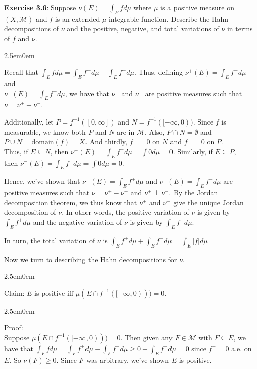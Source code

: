 \documentclass{book}
\newcommand{\exTwoP}{%
   \color{RedViolet}%
   \fontsize{13}{15}\selectfont%
}
\newcommand{\exPPP}{%
   \color{VioletRed}%
   \fontsize{12}{14}\selectfont%
}
\newenvironment{myIndent}{%
   \begin{adjustwidth}{2.5em}{0em}%
}{%
   \end{adjustwidth}%
}
\newcommand{\blab}[1]{\textbf{#1}}
\newcommand{\retTwo}{\hfill\bigbreak}
\begin{document}
\blab{Exercise 3.6}: Suppose $\nu(E) = \int_E f d\mu$ where $\mu$ is a positive measure on $(X, \mathcal{M})$ and $f$ is an extended $\mu$-integrable function. Describe the Hahn decompositions of $\nu$ and the positive, negative, and total variations of $\nu$ in terms of $f$ and $\nu$.

\begin{myIndent}\exTwoP
	Recall that $\int_E f d\mu = \int_E f^+ d\mu - \int_E f^-d\mu$. Thus, defining $\nu^+(E) = \int_E f^+ d\mu$ and\\ [2pt] $\nu^-(E) = \int_E f^-d\mu$, we have that $\nu^+$ and $\nu^-$ are positive measures such that\\ $\nu = \nu^+ - \nu^-$.\retTwo
	
	Additionally, let $P = f^{-1}( [0, \infty])$ and $N = f^{-1}( [-\infty, 0))$. Since $f$ is\\ measurable, we know both $P$ and $N$ are in $\mathcal{M}$. Also, $P \cap N = \emptyset$ and\\ $P \cup N = \mathrm{domain}(f) = X$. And thirdly, $f^+ = 0$ on $N$ and $f^- = 0$ on $P$.\\ Thus, if $E \subseteq N$, then $\nu^+(E) = \int_E f^+d\mu = \int 0 d\mu = 0$.  Similarly, if $E \subseteq P$,\\ then $\nu^-(E) = \int_E f^-d\mu = \int 0 d\mu = 0$.\retTwo

	Hence, we've shown that $\nu^+(E) = \int_E f^+ d\mu$ and $\nu^-(E) = \int_E f^-d\mu$ are positive measures such that $\nu = \nu^+ - \nu^-$ and $\nu^+ \perp \nu^-$. By the Jordan decomposition theorem, we thus know that $\nu^+$ and $\nu^-$ give the unique Jordan decomposition of $\nu$. In other words, the positive variation of $\nu$ is given by $\int_E f^+ d\mu$ and the negative variation of $\nu$ is given by $\int_E f^- d\mu$.\newpage

	In turn, the total variation of $\nu$ is $\int_E f^+ d\mu + \int_E f^- d\mu = \int_E |f|d\mu$\retTwo

	Now we turn to describing the Hahn decompositions for $\nu$.
	\begin{myIndent}
		Claim: $E$ is positive iff $\mu(E \cap f^{-1}([-\infty, 0))) = 0$.
		
		\begin{myIndent}\exPPP
			Proof:\\
			Suppose $\mu(E \cap f^{-1}([-\infty, 0))) = 0$. Then given any $F \in \mathcal{M}$ with $F \subseteq E$, we have that $\int_F fd\mu = \int_F f^+d\mu - \int_F f^- d\mu \geq 0 - \int_E f^-d\mu = 0$ since $f^- = 0$ a.e. on $E$. So $\nu(F) \geq 0$. Since $F$ was arbitrary, we've shown $E$ is positive.\retTwo


\end{myIndent}
\end{myIndent}
\end{myIndent}
\end{document}
